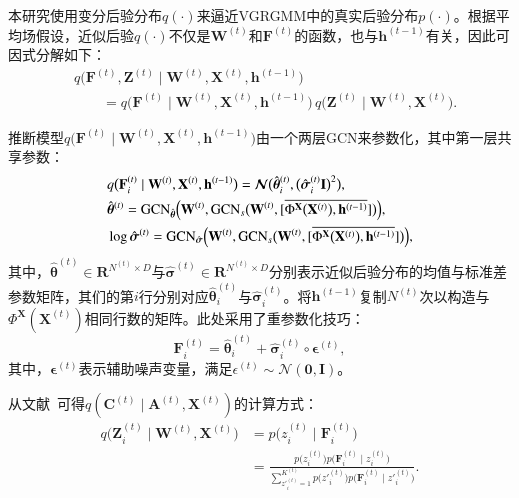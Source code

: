 

本研究使用变分后验分布$q(\cdot)$来逼近VGRGMM中的真实后验分布$p(\cdot)$。根据平均场假设，近似后验$q(\cdot)$不仅是$\mathbf{W}^{(t)}$和$\mathbf{F}^{(t)}$的函数，也与$\mathbf{h}^{(t-1)}$有关，因此可因式分解如下：
\begin{align}
        & q\bigl(\mathbf{F}^{(t)},\mathbf{Z}^{(t)}\mid \mathbf{W}^{(t)},\mathbf{X}^{(t)},\mathbf{h}^{(t-1)}\bigr) \nonumber\\
        & \qquad = q\bigl(\mathbf{F}^{(t)}\mid \mathbf{W}^{(t)},\mathbf{X}^{(t)},\mathbf{h}^{(t-1)}\bigr)\,q\bigl(\mathbf{Z}^{(t)}\mid\bm{W}^{(t)},\bm{X}^{(t)}\bigr). \label{eq:9}
\end{align}

\noindent 推断模型$q\bigl(\mathbf{F}^{(t)}\mid \mathbf{W}^{(t)},\mathbf{X}^{(t)},\mathbf{h}^{(t-1)}\bigr)$由一个两层GCN来参数化，其中第一层共享参数：
\begin{align}
    & q\bigl(\mathbf{F}_i^{(t)}\mid \mathbf{W}^{(t)},\mathbf{X}^{(t)},\mathbf{h}^{(t-1)}\bigr) 
    = \bm{\mathcal{N}}\bigl(\hat{\bm{\theta}}^{(t)}_i,\bigl(\hat{\bm{\sigma}}^{(t)}_i\mathbf{I}\bigr)^2\bigr), \nonumber\label{eq:10}\\
    & \hat{\bm{\theta}}^{(t)}=\mathrm{GCN}_{\hat{\bm{\theta}}}\Bigl(\mathbf{W}^{(t)}, \mathrm{GCN}_{s}\bigl(\mathbf{W}^{(t)},[\overline{ \Phi^{\mathbf{X}}\bigl(\mathbf{X}^{(t)}\bigr), \mathbf{h}^{(t-1)}} ]\bigr)\Bigr), \\
    & \log\hat{\bm{\sigma}}^{(t)}=\mathrm{GCN}_{\hat{\bm{\sigma}}}\Bigl(\mathbf{W}^{(t)}, \mathrm{GCN}_{s}\bigl(\mathbf{W}^{(t)},[\overline{ \Phi^{\mathbf{X}}\bigl(\mathbf{X}^{(t)}\bigr), \mathbf{h}^{(t-1)} }]\bigr)\Bigr), \nonumber
\end{align}
其中，$\hat{\bm{\theta}}^{(t)} \in \boldsymbol{R}^{N^{(t)}\times D}$与$\hat{\bm{\sigma}}^{(t)}\in \boldsymbol{R}^{N^{(t)}\times D}$分别表示近似后验分布的均值与标准差参数矩阵，其们的第$i$行分别对应$\hat{\bm{\theta}}^{(t)}_i$与$\hat{\bm{\sigma}}^{(t)}_i$。将$\mathbf{h}^{(t-1)}$复制$N^{(t)}$次以构造与$\Phi^{\mathbf{X}}(\mathbf{X}^{(t)})$相同行数的矩阵。此处采用了重参数化技巧：
\begin{equation}
    \mathbf{F}_{i}^{(t)} = \hat{\bm{\theta}}^{(t)}_i + \hat{\bm{\sigma}}^{(t)}_i \circ \bm{\epsilon}^{(t)},
    \label{eq:11}
\end{equation}
其中，$\bm{\epsilon}^{(t)}$表示辅助噪声变量，满足$\epsilon^{(t)} \sim \mathcal{N}(\bm{0}, \mathbf{I})$。

从文献~\cite{jiang2017variational}可得$q(\mathbf{C}^{(t)}\mid \mathbf{A}^{(t)},\mathbf{X}^{(t)})$的计算方式：
\begin{align}
    q\bigl(\mathbf{Z}_i^{(t)}\mid \mathbf{W}^{(t)},  \mathbf{X}^{(t)}\bigr)  &= p\bigl(z_i^{(t)}\mid \mathbf{F}^{(t)}_i\bigr) \nonumber \\ 
     &=  \frac{p\bigl(z_i^{(t)}\bigr)p\bigl(\mathbf{F}_i^{(t)}\mid z_i^{(t)}\bigr)}{\sum_{{z'}_i^{(t)}=1}^{K^{(t)}} p\bigl({z'}_i^{(t)}\bigr)p\bigl(\mathbf{F}_i^{(t)}\mid {z'}_i^{(t)}\bigr)}. \label{eq:12}
\end{align}


